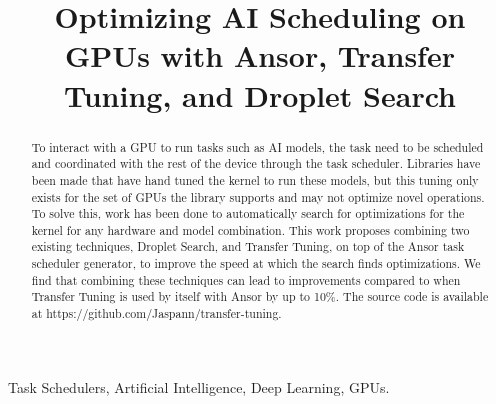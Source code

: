 \documentclass[conference]{IEEEtran}
\begin{document}
\title{Optimizing AI Scheduling on GPUs with Ansor, Transfer Tuning, and Droplet Search}  

\author{
\and
{}
\and
{}
}

\maketitle

\begin{abstract}
To interact with a GPU to run tasks such as AI models, the task need to be scheduled and coordinated with the rest of the device through the task scheduler. Libraries have been made that have hand tuned the kernel to run these models, but this tuning only exists for the set of GPUs the library supports and may not optimize novel operations. To solve this, work has been done to automatically search for optimizations for the kernel for any hardware and model combination. This work proposes combining two existing techniques, Droplet Search, and Transfer Tuning, on top of the Ansor task scheduler generator, to improve the speed at which the search finds optimizations. We find that combining these techniques can lead to improvements compared to when Transfer Tuning is used by itself with Ansor by up to 10\%. The source code is available at https://github.com/Jaspann/transfer-tuning.
\end{abstract}

\begin{IEEEkeywords}
Task Schedulers, Artificial Intelligence, Deep Learning, GPUs.
\end{IEEEkeywords}
\end{document}

